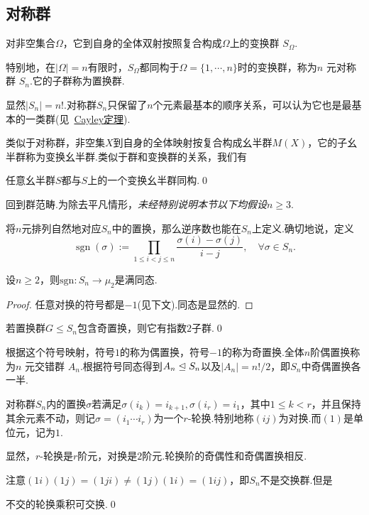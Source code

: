 \subsection{对称群}
对非空集合$\Omega$，它到自身的全体双射按照复合构成$\Omega$上的{\heiti 变换群} $S_\Omega$.

特别地，在$|\Omega|=n$有限时，$S_\Omega$都同构于$\Omega=\{1,\cdots,n\}$时的变换群，称为$n$ {\heiti 元对称群} $S_n$.它的子群称为{\heiti 置换群}.

显然$|S_n|=n!$.对称群$S_n$只保留了$n$个元素最基本的顺序关系，可以认为它也是最基本的一类群(见~\hyperlink{thm:Cayley}{Cayley定理}).

类似于对称群，非空集$X$到自身的全体映射按复合构成幺半群$M(X)$，它的子幺半群称为{\heiti 变换幺半群}.类似于群和变换群的关系，我们有
\begin{lemma}
	任意幺半群$S$都与$S$上的一个变换幺半群同构.\qed
\end{lemma}

回到群范畴.为除去平凡情形，\emph{未经特别说明本节以下均假设$n\ge 3$}.

将$n$元排列自然地对应$S_n$中的置换，那么逆序数也能在$S_n$上定义.确切地说，定义
\[
	\operatorname*{sgn}(\sigma):=\prod_{1\le i<j\le n}\frac{\sigma(i)-\sigma(j)}{i-j},\quad\forall\sigma\in S_n.
\]
\vspace*{-8pt}
\begin{lemma}
	设$n\ge 2$，则$\mathrm{sgn}\colon S_n\to\mu_2$是满同态.
\end{lemma}
\begin{proof}
	任意对换的符号都是$-1$(见下文).同态是显然的.
\end{proof}
\begin{cor*}
	若置换群$G\le S_n$包含奇置换，则它有指数$2$子群.\qed\hypertarget{cor:Index2Permutation}{}
\end{cor*}

根据这个符号映射，符号$1$的称为{\heiti 偶置换}，符号$-1$的称为{\heiti 奇置换}.全体$n$阶偶置换称为$n$ {\heiti 元交错群} $A_n$.根据符号同态得到$A_n\trianglelefteq S_n$以及$|A_n|=n!/2$，即$S_n$中奇偶置换各一半.

对称群$S_n$内的置换$\sigma$若满足$\sigma(i_k)=i_{k+1},\sigma(i_r)=i_1$，其中$1\le k<r$，并且保持其余元素不动，则记$\sigma=(i_1\cdots i_r)$为一个$r${\heiti -轮换}.特别地称$(ij)$为{\heiti 对换}.而$(1)$是单位元，记为$1$.

显然，$r$-轮换是$r$阶元，对换是$2$阶元.轮换阶的奇偶性和奇偶置换相反.

注意$(1i)(1j)=(1ji)\ne(1j)(1i)=(1ij)$，即$S_n$不是交换群.但是
\begin{lemma*}
	不交的轮换乘积可交换.\qed
\end{lemma*}

